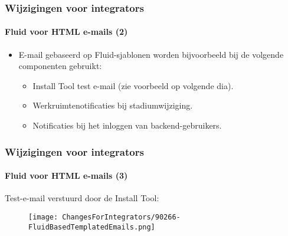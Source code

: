 
\begin{frame}[fragile]
	\frametitle{Wijzigingen voor integrators}
	\framesubtitle{Fluid voor HTML e-mails (2)}

	\begin{itemize}
		\item E-mail gebaseerd op Fluid-sjablonen worden bijvoorbeeld bij de volgende componenten gebruikt:

			\begin{itemize}
				\item Install Tool test e-mail (zie voorbeeld op volgende dia).
				\item Werkruimtenotificaties bij stadiumwijziging.
				\item Notificaties bij het inloggen van backend-gebruikers.
			\end{itemize}

	\end{itemize}

\end{frame}


\begin{frame}[fragile]
	\frametitle{Wijzigingen voor integrators}
	\framesubtitle{Fluid voor HTML e-mails (3)}

	Test-e-mail verstuurd door de Install Tool:

	\begin{figure}
		\texttt{[image: ChangesForIntegrators/90266-FluidBasedTemplatedEmails.png]}
	\end{figure}

\end{frame}


